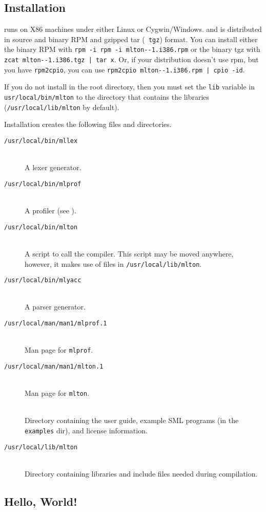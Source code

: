 
\subsection{Installation}

{\mlton} runs on X86 machines under either Linux or Cygwin/Windows.
and is distributed in source and binary RPM and gzipped tar ({\tt
tgz}) format.  You can install either the binary RPM with {\tt rpm -i
rpm -i mlton-\version-1.i386.rpm} or the binary tgz with {\tt zcat
mlton-\version-1.i386.tgz | tar x}.  Or, if your distribution doesn't
use rpm, but you have {\tt rpm2cpio}, you can use {\tt rpm2cpio
mlton-\version-1.i386.rpm | cpio -id}.

If you do not install {\mlton} in the root directory, then you must
set the {\tt lib} variable in {\tt usr/local/bin/mlton} to the
directory that contains the libraries ({\tt /usr/local/lib/mlton} by
default).

Installation creates the following files and directories.

\newcommand{\place}[1]{\item[\tt #1]\hspace{1in}\\}

\begin{description}

\place{/usr/local/bin/mllex}
A lexer generator.

\place{/usr/local/bin/mlprof}
A profiler (see ).

\place{/usr/local/bin/mlton}
A script to call the compiler.
This script may be moved anywhere, however,
it makes use of files in {\tt /usr/local/lib/mlton}.

\place{/usr/local/bin/mlyacc}
A parser generator.

\place{/usr/local/man/man1/mlprof.1}
Man page for {\tt mlprof}.

\place{/usr/local/man/man1/mlton.1}
Man page for {\tt mlton}.

\place{\doc}
Directory containing the user guide, example SML programs (in the {\tt examples}
dir), and license information.

\place{/usr/local/lib/mlton}
Directory containing libraries and include files needed during
compilation.

\end{description}

\subsection{Hello, World!}

